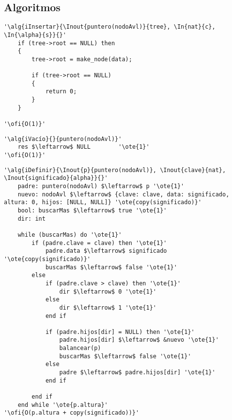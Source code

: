 



\subsection{Algoritmos}

\lstset{style=alg,columns=fixed,basewidth=.5em}

\begin{lstlisting}[mathescape]
'\alg{iInsertar}{\Inout{puntero(nodoAvl)}{tree}, \In{nat}{c}, \In{\alpha}{s}}{}'
    if (tree->root == NULL) then
    {
        tree->root = make_node(data);

        if (tree->root == NULL)
        {
            return 0;
        }
    }
 
'\ofi{O(1)}'
\end{lstlisting}


\lstset{style=alg,columns=fixed,basewidth=.5em}

\begin{lstlisting}[mathescape]
'\alg{iVacío}{}{puntero(nodoAvl)}'
	res $\leftarrow$ NULL		 '\ote{1}'
'\ofi{O(1)}'
\end{lstlisting}

\begin{lstlisting}[mathescape]
'\alg{iDefinir}{\Inout{p}{puntero(nodoAvl)}, \Inout{clave}{nat}, \Inout{significado}{alpha}}{}'
	padre: puntero(nodoAvl) $\leftarrow$ p '\ote{1}'
	nuevo: nodoAvl $\leftarrow$ {clave: clave, data: significado, altura: 0, hijos: [NULL, NULL]} '\ote{copy(significado)}'
	bool: buscarMas $\leftarrow$ true '\ote{1}'
	dir: int

	while (buscarMas) do '\ote{1}'
		if (padre.clave = clave) then '\ote{1}'
			padre.data $\leftarrow$ significado '\ote{copy(significado)}'
			buscarMas $\leftarrow$ false '\ote{1}'
		else
			if (padre.clave > clave) then '\ote{1}'
				dir $\leftarrow$ 0 '\ote{1}'
			else
				dir $\leftarrow$ 1 '\ote{1}'
			end if

		    if (padre.hijos[dir] = NULL) then '\ote{1}'
				padre.hijos[dir] $\leftarrow$ &nuevo '\ote{1}'
				balancear(p)
				buscarMas $\leftarrow$ false '\ote{1}'
			else
				padre $\leftarrow$ padre.hijos[dir] '\ote{1}'
			end if

		end if
	end while '\ote{p.altura}'
'\ofi{O(p.altura + copy(significado))}'
\end{lstlisting}

